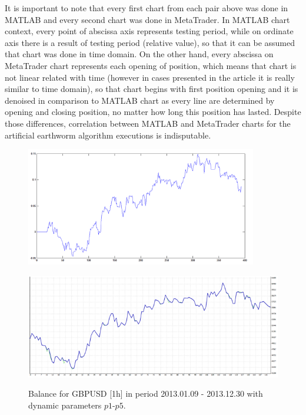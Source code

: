 \documentclass[runningheads,a4paper]{llncs}
\begin{document}
\FloatBarrier
\vspace{-1em}
It is important to note that every first chart from each pair above was done in MATLAB and every second chart was done in MetaTrader. In MATLAB chart context, every point of abscissa axis represents testing period, while on ordinate axis there is a result of testing period (relative value), so that it can be assumed that chart was done in time domain. On the other hand, every abscissa on MetaTrader chart represents each opening of position, which means that chart is not linear related with time (however in cases presented in the article it is really similar to time domain), so that chart begins with first position opening and it is denoised in comparison to MATLAB chart as every line are determined by opening and closing position, no matter how long this position has lasted. Despite those differences, correlation between MATLAB and MetaTrader charts for the artificial earthworm algorithm executions is indisputable.
\begin{figure}[h!]
\begin{minipage}{0.49\textwidth}
\centering
\includegraphics[width = 0.9\textwidth]{figures/rys14.png}
\label{fig:fig14}
\end{minipage}
\begin{minipage}{0.49\textwidth}
\centering
\includegraphics[width = \textwidth]{figures/rys15.png}
\label{fig:fig15}
\end{minipage}
\caption{Balance for GBPUSD [1h] in period 2013.01.09 - 2013.12.30 with dynamic parameters $p1$-$p5$.}
\end{figure}
\FloatBarrier
\vspace{-1em}
\end{document}
